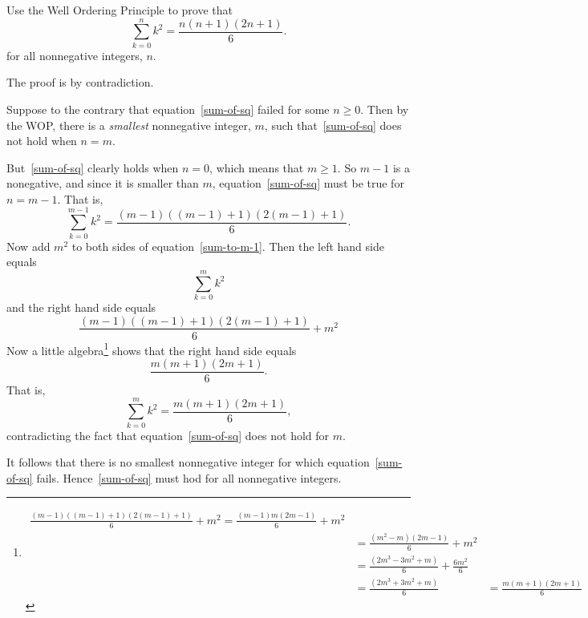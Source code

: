\documentclass[handout]{mcs}
\begin{document}
\begin{problem}
Use the Well Ordering Principle to prove that
\begin{equation}\label{sum-of-sq}
\sum_{k=0}^n k^2 = \frac{n(n+1)(2n+1)}{6}.
\end{equation}
for all nonnegative integers, $n$.


\begin{solution}
The proof is by contradiction.

Suppose to the contrary that equation~\eqref{sum-of-sq} failed for some $n
\geq 0$.  Then by the WOP, there is a \emph{smallest} nonnegative integer,
$m$, such that~\eqref{sum-of-sq} does not hold when $n = m$.

But~\eqref{sum-of-sq} clearly holds when $n = 0$, which means that $m \geq
1$.  So $m-1$ is a nonegative, and since it is smaller than $m$,
equation~\eqref{sum-of-sq} must be true for $n = m-1$.  That is,
\begin{equation}\label{sum-to-m-1}
\sum_{k=0}^{m-1} k^2 = \frac{(m-1)((m-1) + 1)(2(m-1)+1)}{6}.
\end{equation}
Now add $m^2$ to both sides of equation~\eqref{sum-to-m-1}.
Then the left hand side equals
\[
\sum_{k=0}^{m} k^2
\]
and the right hand side equals
\[
\frac{(m-1)((m-1) + 1)(2(m-1)+1)}{6} + m^2 
\]
Now a little algebra\footnote{
\begin{align*}
\frac{(m-1)((m-1) + 1)(2(m-1)+1)}{6} + m^2 
= \frac{(m-1)m(2m-1)}{6} + m^2\\
 &  = \frac{(m^2-m)(2m-1)}{6} + m^2\\
 & = \frac{(2m^3-3m^2 +m)}{6} + \frac{6m^2}{6}\\
 &  = \frac{(2m^3 +3m^2 +m)}{6}
 &  = \frac{m(m+1)(2m+1)}{6}
\end{align*}}
shows that the right hand side equals
\[
\frac{m(m+1)(2m+1)}{6}.
\]
That is,
\[
\sum_{k=0}^{m} k^2 = \frac{m(m+1)(2m+1)}{6},
\]
contradicting the fact that equation~\eqref{sum-of-sq} does not hold for
$m$.

It follows that there is no smallest nonnegative integer for which
equation~\eqref{sum-of-sq} fails.  Hence~\eqref{sum-of-sq} must hod for
all nonnegative integers.

\end{solution}

\end{problem}
\end{document}
